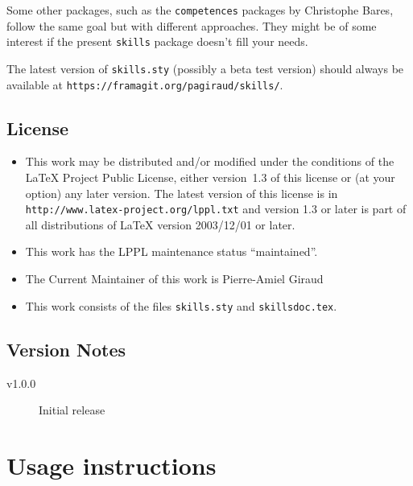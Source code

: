 \documentclass[12pt]{exam}
\begin{document}
Some other packages, such as the \verb|competences| packages by Christophe Bares, follow the
same goal but with different approaches. They might be of some interest if the present
\verb|skills| package doesn't fill your needs.

The latest version of \verb"skills.sty" (possibly a
%
beta test version) should always be available at
\verb"https://framagit.org/pagiraud/skills/".

\subsection{License}

\begin{itemize}
\item This work may be distributed and/or modified under the
  conditions of the \LaTeX{} Project Public
  License, either version~1.3 of this
  license or (at your option) any later version.  The latest version
  of this license is in \verb"http://www.latex-project.org/lppl.txt"
  and version 1.3 or later is part of all distributions of \LaTeX{}
  version 2003/12/01 or later.
\item This work has the LPPL maintenance status ``maintained''.
\item  The Current Maintainer of this work is Pierre-Amiel Giraud
\item This work consists of the files \verb"skills.sty" and
  \verb"skillsdoc.tex".
\end{itemize}

\subsection{Version Notes}

\begin{description}
	\item[v1.0.0] Initial release
\end{description}

\section{Usage instructions}
\label{sec:Usage}
\end{document}
